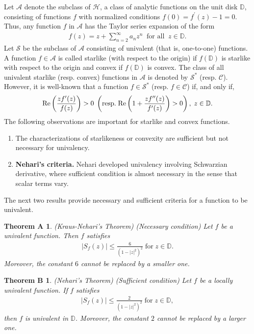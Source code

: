 \documentclass[a4paper,12pt]{amsart}
\theoremstyle{plain}
\theoremstyle{definition}
\theoremstyle{plain}
\newtheorem*{thmA}{Theorem A}
\newtheorem*{thmB}{Theorem B}
\newcounter {own}
\begin{document}
Let $\mathcal{A}$ denote the subclass of $\mathcal{H}$, a class of analytic functions on the unit disk $\mathbb{D}$,  consisting of functions $f$ with normalized conditions $f(0)=f^{\prime}(z)-1=0$. Thus, any function $f$ in $\mathcal{A}$ has the Taylor series expansion of the form 
\begin{align}\label{Eq-1.3}
	f(z)=z+\sum_{n=2}^{\infty}a_nz^n\;\; \mbox{for all}\;\; z\in\mathbb{D}.
\end{align}
Let $\mathcal{S}$ be the subclass of $\mathcal{A}$ consisting of univalent (that is, one-to-one) functions. A function $f\in \mathcal{A}$ is called starlike (with respect to the origin) if $f(\mathbb{D})$ is starlike with respect to the origin and convex if $f(\mathbb{D})$ is convex. The class of all univalent starlike (resp. convex) functions in $\mathcal{A}$ is denoted by $\mathcal{S}^*$ (resp. $\mathcal{C}$). However, it is well-known that a function $f\in\mathcal{S}^*$ (resp. $f\in\mathcal{C}$) if, and only if, 
\begin{align*}
	{\rm Re}\left(\frac{zf^{\prime}(z)}{f(z)}\right)>0\; \left(\mbox{resp.}\; {\rm Re}\left(1+\frac{zf^{\prime\prime}(z)}{f^{\prime}(z)}\right)>0\right),\; z\in\mathbb{D}.
\end{align*}
The following observations are important for starlike and convex functions.
\begin{enumerate}
	\item[$\bullet$] The characterizations of starlikeness or convexity are sufficient but not necessary for univalency.\vspace{2mm}
	
	\item[$\bullet$] {\bf Nehari's criteria.} Nehari developed univalency involving Schwarzian derivative, where sufficient condition is almost necessary in the sense that scalar terms vary.
\end{enumerate}
The next two results provide necessary and sufficient criteria for a function to be univalent.
\begin{thmA}\emph{(Kraus-Nehari's Theorem) (Necessary condition)}
	Let $f$ be a univalent function. Then $f$ satisfies
	\begin{align*}
		|S_f(z)|\leq\frac{6}{(1-|z|^2)^2}\; \mbox{for}\; z\in\mathbb{D}.
	\end{align*}
	Moreover, the constant $6$ cannot be replaced by a smaller one.
\end{thmA}
\begin{thmB}\emph{(Nehari's Theorem) (Sufficient condition)}
	Let $f$ be a locally univalent function. If $f$ satisfies
	\begin{align*}
		|S_f(z)|\leq\frac{2}{(1-|z|^2)^2}\; \mbox{for}\; z\in\mathbb{D},
	\end{align*}
	then $f$ is univalent in $\mathbb{D}$. Moreover, the constant $2$ cannot be replaced by a larger one.
\end{thmB}
\end{document}

